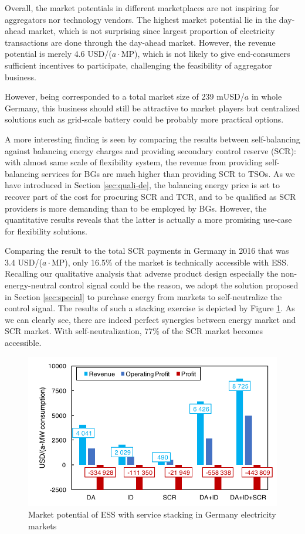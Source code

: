Overall, the market potentials in different marketplaces are not inspiring for aggregators nor technology vendors. The highest market potential lie in the day-ahead market, which is not surprising since largest proportion of electricity transactions are done through the day-ahead market. However, the revenue potential is merely 4.6 USD/($a\cdot$MP), which is not likely to give end-consumers sufficient incentives to participate, challenging the feasibility of aggregator business. 

However, being corresponded to a total market size of 239 mUSD/$a$ in whole Germany, this business should still be attractive to market players but centralized solutions such as grid-scale battery could be probably more practical options. 

A more interesting finding is seen by comparing the results between self-balancing against balancing energy charges and providing secondary control reserve (SCR): with almost same scale of flexibility system, the revenue from providing self-balancing services for BGs are much higher than providing SCR to TSOs. As we have introduced in Section \ref{sec:quali-de}, the balancing energy price is set to recover part of the cost for procuring SCR and TCR, and to be qualified as SCR providers is more demanding than to be employed by BGs. However, the quantitative results reveals that the latter is actually a more promising use-case for flexibility solutions. 

Comparing the result to the total SCR payments in Germany in 2016 that was 3.4 USD/($a\cdot$MP), only 16.5\% of the market is technically accessible with ESS. Recalling our qualitative analysis that adverse product design especially the non-energy-neutral control signal could be the reason, we adopt the solution proposed in Section \ref{sec:special} to purchase energy from markets to self-neutralize the control signal. The results of such a stacking exercise is depicted by Figure \ref{fig:germany-ess-multitasking}. As we can clearly see, there are indeed perfect synergies between energy market and SCR market. With self-neutralization, 77\% of the SCR market becomes accessible.

\begin{figure}[h!]
	\centering
	\includegraphics[width=0.95\linewidth]{Figures/Germany_ESS_multitasking}
	\caption{Market potential of ESS with service stacking in Germany electricity markets}
	\label{fig:germany-ess-multitasking}
\end{figure}


